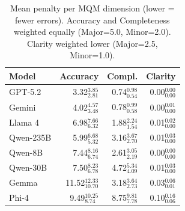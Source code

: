 \begin{table}[h]
\centering
\small
\begin{tabular}{@{}lrrr@{}}
\toprule
\textbf{Model} & \textbf{Accuracy} & \textbf{Compl.} & \textbf{Clarity} \\
\midrule
GPT-5.2 & 3.32$_{\scriptstyle 2.81}^{\scriptstyle 3.85}$ & 0.74$_{\scriptstyle 0.54}^{\scriptstyle 0.98}$ & 0.00$_{\scriptstyle 0.00}^{\scriptstyle 0.00}$ \\
Gemini & 4.02$_{\scriptstyle 3.48}^{\scriptstyle 4.57}$ & 0.78$_{\scriptstyle 0.58}^{\scriptstyle 0.99}$ & 0.00$_{\scriptstyle 0.00}^{\scriptstyle 0.01}$ \\
Llama 4 & 6.98$_{\scriptstyle 6.32}^{\scriptstyle 7.66}$ & 1.88$_{\scriptstyle 1.54}^{\scriptstyle 2.24}$ & 0.01$_{\scriptstyle 0.00}^{\scriptstyle 0.02}$ \\
Qwen-235B & 5.99$_{\scriptstyle 5.32}^{\scriptstyle 6.68}$ & 3.16$_{\scriptstyle 2.70}^{\scriptstyle 3.67}$ & 0.01$_{\scriptstyle 0.00}^{\scriptstyle 0.03}$ \\
Qwen-8B & 7.44$_{\scriptstyle 6.74}^{\scriptstyle 8.16}$ & 2.61$_{\scriptstyle 2.19}^{\scriptstyle 3.05}$ & 0.00$_{\scriptstyle 0.00}^{\scriptstyle 0.00}$ \\
Qwen-30B & 7.50$_{\scriptstyle 6.78}^{\scriptstyle 8.23}$ & 4.72$_{\scriptstyle 4.09}^{\scriptstyle 5.34}$ & 0.01$_{\scriptstyle 0.00}^{\scriptstyle 0.03}$ \\
Gemma & 11.52$_{\scriptstyle 10.70}^{\scriptstyle 12.33}$ & 3.18$_{\scriptstyle 2.73}^{\scriptstyle 3.64}$ & 0.03$_{\scriptstyle 0.01}^{\scriptstyle 0.06}$ \\
Phi-4 & 9.49$_{\scriptstyle 8.74}^{\scriptstyle 10.25}$ & 8.75$_{\scriptstyle 7.78}^{\scriptstyle 9.81}$ & 0.10$_{\scriptstyle 0.06}^{\scriptstyle 0.16}$ \\
\bottomrule
\end{tabular}
\caption{Mean penalty per MQM dimension (lower = fewer errors). Accuracy and Completeness weighted equally (Major=5.0, Minor=2.0). Clarity weighted lower (Major=2.5, Minor=1.0).}
\label{tab:mqm-dimensions}
\end{table}
